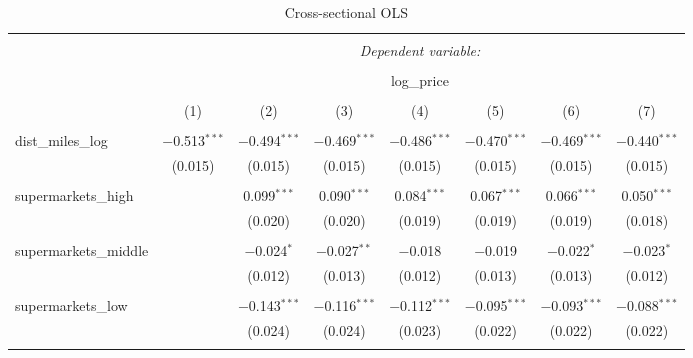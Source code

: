 \documentclass{article}
\begin{document}
\begin{table}[H] \centering 
  \caption{Cross-sectional OLS} 
  \label{table:hedonic} 
\small 
\begin{tabular}{@{\extracolsep{-10pt}}lccccccc} 
\\[-1.8ex]\hline 
\hline \\[-1.8ex] 
 & \multicolumn{7}{c}{\textit{Dependent variable:}} \\ 
\cline{2-8} 
\\[-1.8ex] & \multicolumn{7}{c}{log\_price} \\ 
\\[-1.8ex] & (1) & (2) & (3) & (4) & (5) & (6) & (7)\\ 
\hline \\[-1.8ex] 
 dist\_miles\_log & $-$0.513$^{***}$ & $-$0.494$^{***}$ & $-$0.469$^{***}$ & $-$0.486$^{***}$ & $-$0.470$^{***}$ & $-$0.469$^{***}$ & $-$0.440$^{***}$ \\ 
  & (0.015) & (0.015) & (0.015) & (0.015) & (0.015) & (0.015) & (0.015) \\ 
  & & & & & & & \\ 
 supermarkets\_high &  & 0.099$^{***}$ & 0.090$^{***}$ & 0.084$^{***}$ & 0.067$^{***}$ & 0.066$^{***}$ & 0.050$^{***}$ \\ 
  &  & (0.020) & (0.020) & (0.019) & (0.019) & (0.019) & (0.018) \\ 
  & & & & & & & \\ 
 supermarkets\_middle &  & $-$0.024$^{*}$ & $-$0.027$^{**}$ & $-$0.018 & $-$0.019 & $-$0.022$^{*}$ & $-$0.023$^{*}$ \\ 
  &  & (0.012) & (0.013) & (0.012) & (0.013) & (0.013) & (0.012) \\ 
  & & & & & & & \\ 
 supermarkets\_low &  & $-$0.143$^{***}$ & $-$0.116$^{***}$ & $-$0.112$^{***}$ & $-$0.095$^{***}$ & $-$0.093$^{***}$ & $-$0.088$^{***}$ \\ 
  &  & (0.024) & (0.024) & (0.023) & (0.022) & (0.022) & (0.022) \\ 
  & & & & & & & \\ 

\end{tabular}
\end{table}
\end{document}
